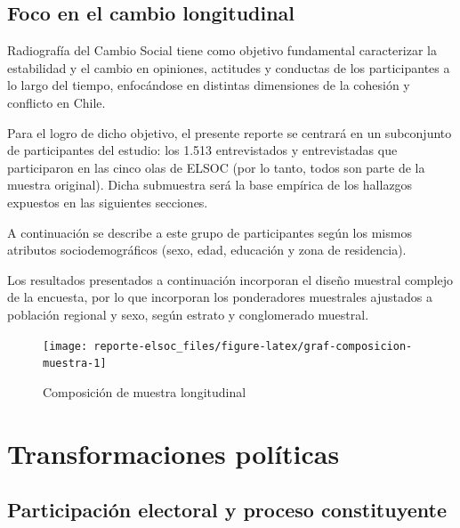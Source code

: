 \documentclass[
  12pt,
]{book}
\begin{document}
\hypertarget{foco-en-el-cambio-longitudinal}{%
\section{Foco en el cambio longitudinal}\label{foco-en-el-cambio-longitudinal}}

Radiografía del Cambio Social tiene como objetivo fundamental caracterizar la estabilidad y el cambio en opiniones, actitudes y conductas de los participantes a lo largo del tiempo, enfocándose en distintas dimensiones de la cohesión y conflicto en Chile.

Para el logro de dicho objetivo, el presente reporte se centrará en un subconjunto de participantes del estudio: los 1.513 entrevistados y entrevistadas que participaron en las cinco olas de ELSOC (por lo tanto, todos son parte de la muestra original). Dicha submuestra será la base empírica de los hallazgos expuestos en las siguientes secciones.

A continuación se describe a este grupo de participantes según los mismos atributos sociodemográficos (sexo, edad, educación y zona de residencia).

Los resultados presentados a continuación incorporan el diseño muestral complejo de la encuesta, por lo que incorporan los ponderadores muestrales ajustados a población regional y sexo, según estrato y conglomerado muestral.

\begin{figure}

{\centering \texttt{[image: reporte-elsoc\_files/figure-latex/graf-composicion-muestra-1]} 

}

\caption{Composición de muestra longitudinal}\label{fig:graf-composicion-muestra}
\end{figure}

\hypertarget{transformaciones-poluxedticas}{%
\chapter{Transformaciones políticas}\label{transformaciones-poluxedticas}}

\hypertarget{participaciuxf3n-electoral-y-proceso-constituyente}{%
\section{Participación electoral y proceso constituyente}\label{participaciuxf3n-electoral-y-proceso-constituyente}}
\end{document}
